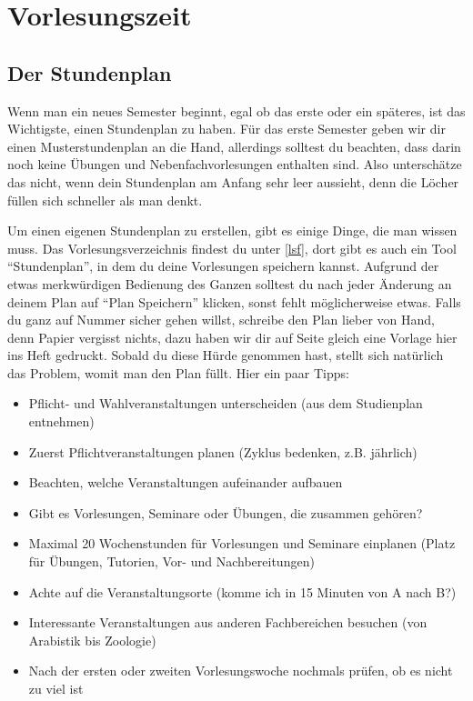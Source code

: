 ﻿\chapter{Vorlesungszeit}

\section{Der Stundenplan}

Wenn man ein neues Semester beginnt, egal ob das erste oder ein späteres, ist das Wichtigste, einen Stundenplan zu haben. Für das erste Semester geben wir dir einen Musterstundenplan an die Hand, allerdings solltest du beachten, dass darin noch keine Übungen und Nebenfachvorlesungen enthalten sind. Also unterschätze das nicht, wenn dein Stundenplan am Anfang sehr leer aussieht, denn die Löcher füllen sich schneller als man denkt.

Um einen eigenen Stundenplan zu erstellen, gibt es einige Dinge, die man wissen
muss. Das Vorlesungsverzeichnis findest du unter \ref{lsf}, dort gibt es auch
ein Tool ``Stundenplan'', in dem du deine Vorlesungen speichern kannst.
Aufgrund der etwas merkwürdigen Bedienung des Ganzen solltest du nach jeder
Änderung an deinem Plan auf ``Plan Speichern'' klicken, sonst fehlt
möglicherweise etwas. Falls du ganz auf Nummer sicher gehen willst, schreibe den
Plan lieber von Hand, denn Papier vergisst nichts, dazu haben wir dir auf Seite
\pageref{studenplan} gleich eine Vorlage hier ins Heft gedruckt. Sobald du
diese Hürde genommen hast, stellt sich natürlich das Problem, womit man den
Plan füllt.  Hier ein paar Tipps:

\begin{itemize}
	\item Pflicht- und Wahlveranstaltungen unterscheiden (aus dem Studienplan entnehmen)
	\item Zuerst Pflichtveranstaltungen planen (Zyklus bedenken, z.B. jährlich)
	\item Beachten, welche Veranstaltungen aufeinander aufbauen
	\item Gibt es Vorlesungen, Seminare oder Übungen, die zusammen gehören?
	\item Maximal 20 Wochenstunden für Vorlesungen und Seminare einplanen (Platz für Übungen, Tutorien, Vor- und Nachbereitungen)
	\item Achte auf die Veranstaltungsorte (komme ich in 15 Minuten von A nach B?)
	\item Interessante Veranstaltungen aus anderen Fachbereichen besuchen (von Arabistik bis Zoologie)
	\item Nach der ersten oder zweiten Vorlesungswoche nochmals prüfen, ob es nicht zu viel ist
\end{itemize}


